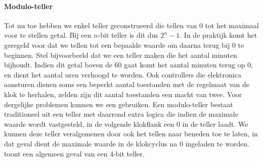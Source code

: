 \paragraph{Modulo-teller}Tot nu toe hebben we enkel teller geconstrueerd die tellen van 0 tot het maximaal voor te stellen getal. Bij een $n$-bit teller is dit dus $2^n-1$. In de praktijk komt het geregeld voor dat we tellen tot een bepaalde waarde om daarna terug bij 0 te beginnen. Stel bijvoorbeeld dat we een teller maken die het aantal minuten bijhoudt. Indien dit getal boven de 60 gaat komt het aantal minuten terug op 0, en dient het aantal uren verhoogd te worden. Ook controllers die elektronica aansturen dienen soms een beperkt aantal toestanden met de regelmaat van de klok te herhalen, zelden zijn dit aantal toestanden een macht van twee. Voor dergelijke problemen kunnen we een  gebruiken. Een modulo-teller bestaat traditioneel uit een teller met daarrond extra logica die indien de maximale waarde wordt vastgesteld, in de volgende klokflank een 0 in de teller laadt. We kunnen deze teller veralgemenen door ook het tellen naar beneden toe te laten, in dat geval dient de maximale waarde in de klokcyclus na 0 ingeladen te worden.  toont een algemeen geval van een 4-bit teller.
